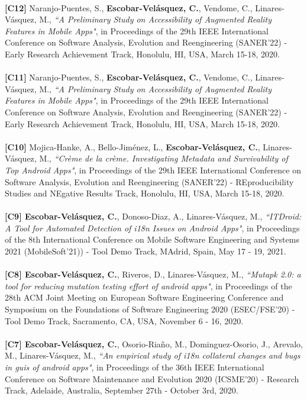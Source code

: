 \documentclass[letterpaper,11pt,oneside]{article}
\begin{document}
\\
\noindent \textbf{[C12]} Naranjo-Puentes, S., \textbf{Escobar-Velásquez, C.}, Vendome, C., Linares-V\'asquez,  M., \textit{``A Preliminary Study on Accessibility of Augmented Reality Features in Mobile Apps"}, in Proceedings of the 29th IEEE International Conference on Software Analysis, Evolution and Reengineering (SANER'22) - Early Research Achievement Track, Honolulu, HI, USA, March 15-18, 2020. \\
\\
\noindent \textbf{[C11]} Naranjo-Puentes, S., \textbf{Escobar-Velásquez, C.}, Vendome, C., Linares-V\'asquez,  M., \textit{``A Preliminary Study on Accessibility of Augmented Reality Features in Mobile Apps"}, in Proceedings of the 29th IEEE International Conference on Software Analysis, Evolution and Reengineering (SANER'22) - Early Research Achievement Track, Honolulu, HI, USA, March 15-18, 2020. \\
\\
\noindent \textbf{[C10]} Mojica-Hanke, A., Bello-Jiménez, L., \textbf{Escobar-Velásquez, C.}, Linares-V\'asquez,  M., \textit{``Cr\`eme de la cr\`eme. Investigating Metadata and Survivability of Top Android Apps"}, in Proceedings of the 29th IEEE International Conference on Software Analysis, Evolution and Reengineering (SANER'22) - REproducibility Studies and NEgative Results Track, Honolulu, HI, USA, March 15-18, 2020. \\
\\
\noindent \textbf{[C9] Escobar-Velásquez, C.}, Donoso-Diaz, A., Linares-V\'asquez,  M., \textit{``ITDroid: A Tool for Automated Detection of i18n Issues on Android Apps"}, in Proceedings of the 8th International Conference on Mobile Software Engineering and Systems 2021 (MobileSoft'21)) - Tool Demo Track, MAdrid, Spain, May 17 - 19, 2021. \\
\\
\noindent \textbf{[C8] Escobar-Velásquez, C.}, Riveros, D., Linares-V\'asquez,  M., \textit{``Mutapk 2.0: a tool for reducing mutation testing effort of android apps"}, in Proceedings of the 28th ACM Joint Meeting on European Software Engineering Conference and Symposium on the Foundations of Software Engineering 2020 (ESEC/FSE’20) - Tool Demo Track, Sacramento, CA, USA, November 6 - 16, 2020. \\
\\
\noindent \textbf{[C7] Escobar-Velásquez, C.}, Osorio-Ria\~no, M., Dominguez-Osorio, J., Arevalo, M., Linares-V\'asquez,  M., \textit{``An empirical study of i18n collateral changes and bugs in guis of android apps"}, in Proceedings of the 36th IEEE International Conference on Software Maintenance and Evolution 2020 (ICSME’20) - Research Track, Adelaide, Australia, September 27th - October 3rd, 2020. \\
\end{document}

